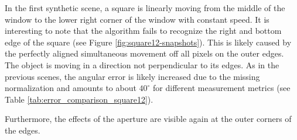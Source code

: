 In the first synthetic scene, a square is linearly moving from the middle of the window to the lower right corner of the window with constant speed.
It is interesting to note that the algorithm fails to recognize the right and bottom edge of the square (see Figure \ref{fig:square12-snapshots}).
This is likely caused by the perfectly aligned simultaneous movement off all pixels on the outer edges.
The object is moving in a direction not perpendicular to its edges.
As in the previous scenes, the angular error is likely increased due to the missing normalization and amounts to about $40^\circ$ for different measurement metrics (see Table \ref{tab:error_comparison_square12}). 
 
Furthermore, the effects of the aperture are visible again at the outer corners of the edges.

